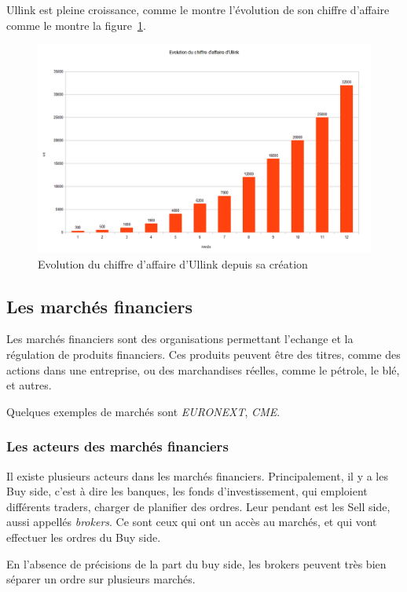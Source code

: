 \documentclass[a4paper, 12pt]{article}
\begin{document}
Ullink est pleine croissance, comme le montre l'évolution de son chiffre d'affaire comme le montre la figure~\ref{ca_ullink}.

\begin{figure}
\includegraphics[width=\textwidth]{ca_ullink.png}
\caption{Evolution du chiffre d'affaire d'Ullink depuis sa création}
\label{ca_ullink}
\end{figure}

\subsection{Les marchés financiers}

Les marchés financiers sont des organisations permettant l'echange et la régulation de produits financiers. Ces produits peuvent être des titres, comme des actions dans une entreprise, ou des marchandises réelles, comme le pétrole, le blé, et autres.

Quelques exemples de marchés sont \emph{EURONEXT}, \emph{CME}.

\subsubsection{Les acteurs des marchés financiers}

Il existe plusieurs acteurs dans les marchés financiers. Principalement, il y a les Buy side, c'est à dire les banques, les fonds d'investissement, qui emploient différents traders, charger de planifier des ordres. Leur pendant est les Sell side, aussi appellés \emph{brokers}. Ce sont ceux qui ont un accès au marchés, et qui vont effectuer les ordres du Buy side.

En l'absence de précisions de la part du buy side, les brokers peuvent très bien séparer un ordre sur plusieurs marchés.
\end{document}
